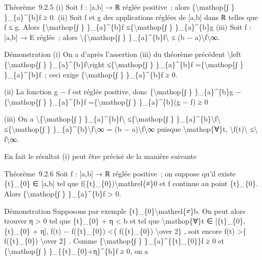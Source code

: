 \documentclass[]{article}
\begin{document}
Théorème~9.2.5 (i) Soit f : {[}a,b{]} → ℝ réglée positive~; alors
\{\textbackslash{}mathop\{∫ \} \}\_\{a\}\^{}\{b\}f ≥ 0. (ii) Soit f et g
des applications réglées de {[}a,b{]} dans ℝ telles que f ≤ g. Alors
\{\textbackslash{}mathop\{∫ \} \}\_\{a\}\^{}\{b\}f
≤\{\textbackslash{}mathop\{∫ \} \}\_\{a\}\^{}\{b\}g (iii) Soit f :
{[}a,b{]} → E réglée~; alors
\textbackslash{}\textbar{}\{\textbackslash{}mathop\{∫ \}
\}\_\{a\}\^{}\{b\}f\textbackslash{}\textbar{} ≤ (b −
a)\textbackslash{}\textbar{}f\textbackslash{}\textbar{}∞.

Démonstration (i) On a d'après l'assertion (iii) du théorème précédent
\textbackslash{}left \textbar{}\{\textbackslash{}mathop\{∫ \}
\}\_\{a\}\^{}\{b\}f\textbackslash{}right \textbar{}
≤\{\textbackslash{}mathop\{∫ \} \}\_\{a\}\^{}\{b\}\textbar{}f\textbar{}
=\{\textbackslash{}mathop\{∫ \} \}\_\{a\}\^{}\{b\}f~; ceci exige
\{\textbackslash{}mathop\{∫ \} \}\_\{a\}\^{}\{b\}f ≥ 0.

(ii) La fonction g − f est réglée positive, donc
\{\textbackslash{}mathop\{∫ \} \}\_\{a\}\^{}\{b\}g
−\{\textbackslash{}mathop\{∫ \} \}\_\{a\}\^{}\{b\}f
=\{\textbackslash{}mathop\{∫ \} \}\_\{a\}\^{}\{b\}(g − f) ≥ 0

(iii) On a \textbackslash{}\textbar{}\{\textbackslash{}mathop\{∫ \}
\}\_\{a\}\^{}\{b\}f\textbackslash{}\textbar{}
≤\{\textbackslash{}mathop\{∫ \}
\}\_\{a\}\^{}\{b\}\textbackslash{}\textbar{}f\textbackslash{}\textbar{}
≤\{\textbackslash{}mathop\{∫ \}
\}\_\{a\}\^{}\{b\}\textbackslash{}\textbar{}f\textbackslash{}\textbar{}∞
= (b − a)\textbackslash{}\textbar{}f\textbackslash{}\textbar{}∞ puisque
\textbackslash{}mathop\{∀\}t,
\textbackslash{}\textbar{}f(t)\textbackslash{}\textbar{}
≤\textbackslash{}\textbar{} f\textbackslash{}\textbar{}∞.

En fait le résultat (i) peut être précisé de la manière suivante

Théorème~9.2.6 Soit f : {[}a,b{]} → ℝ réglée positive~; on suppose qu'il
existe \{t\}\_\{0\} ∈ {[}a,b{]} tel que
f(\{t\}\_\{0\})\textbackslash{}mathrel\{≠\}0 et f continue au point
\{t\}\_\{0\}. Alors \{\textbackslash{}mathop\{∫ \} \}\_\{a\}\^{}\{b\}f
\textgreater{} 0.

Démonstration Supposons par exemple
\{t\}\_\{0\}\textbackslash{}mathrel\{≠\}b. On peut alors trouver η
\textgreater{} 0 tel que \{t\}\_\{0\} + η \textless{} b et tel que
\textbackslash{}mathop\{∀\}t ∈ {[}\{t\}\_\{0\},\{t\}\_\{0\} + η{]},
\textbar{}f(t) − f(\{t\}\_\{0\})\textbar{} \textless{}\{ f(\{t\}\_\{0\})
\textbackslash{}over 2\} , soit encore f(t) \textgreater{}\{
f(\{t\}\_\{0\}) \textbackslash{}over 2\} . Comme
\{\textbackslash{}mathop\{∫ \} \}\_\{a\}\^{}\{\{t\}\_\{0\}\}f ≥ 0 et
\{\textbackslash{}mathop\{∫ \} \}\_\{\{t\}\_\{0\}+η\}\^{}\{b\}f ≥ 0, on
a
\end{document}
